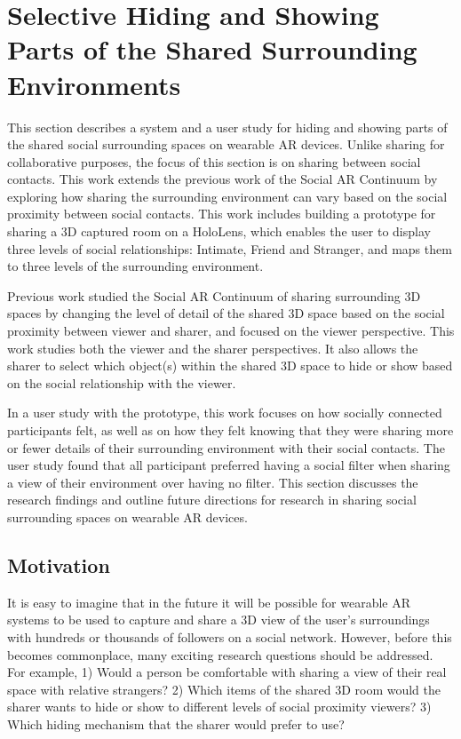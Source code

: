 \section{Selective Hiding and Showing Parts of the Shared Surrounding Environments}
\label{sec:surrounding:hiding}

This section describes a system and a user study for hiding and showing parts of the shared social surrounding spaces on wearable AR devices. Unlike sharing for collaborative purposes, the focus of this section is on sharing between social contacts. This work extends the previous work of the Social AR Continuum by exploring how sharing the surrounding environment can vary based on the social proximity between social contacts. This work includes building a prototype for sharing a 3D captured room on a HoloLens, which enables the user to display three levels of social relationships: Intimate, Friend and Stranger, and maps them to three levels of the surrounding environment.

Previous work studied the Social AR Continuum of sharing surrounding 3D spaces by changing the level of detail of the shared 3D space based on the social proximity between viewer and sharer, and focused on the viewer perspective. This work studies both the viewer and the sharer perspectives. It also allows the sharer to select which object(s) within the shared 3D space to hide or show based on the social relationship with the viewer. 

In a user study with the prototype, this work focuses on how socially connected participants felt, as well as on how they felt knowing that they were sharing more or fewer details of their surrounding environment with their social contacts. The user study found that all participant preferred having a social filter when sharing a view of their environment over having no filter. This section discusses the research findings and outline future directions for research in sharing social surrounding spaces on wearable AR devices. 

\subsection{Motivation}

It is easy to imagine that in the future it will be possible for wearable AR systems to be used to capture and share a 3D view of the user's surroundings with hundreds or thousands of followers on a social network. However, before this becomes commonplace, many exciting research questions should be addressed. For example, 1) Would a person be comfortable with sharing a view of their real space with relative strangers? 2) Which items of the shared 3D room would the sharer wants to hide or show to different levels of social proximity viewers? 3) Which hiding mechanism that the sharer would prefer to use?

